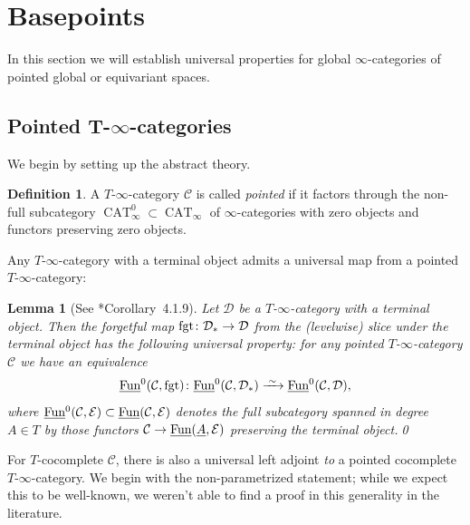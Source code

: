 \documentclass[reqno]{memo-l}
\theoremstyle{mythm}
\newtheorem{lemma}[thm]{Lemma}
\theoremstyle{definition}
\newtheorem{definition}[thm]{Definition}
\numberwithin{equation}{section}
\newcommand{\Cc}{{\mathcal{C}}}
\newcommand{\Dd}{{\mathcal{D}}}
\newcommand{\Ee}{{\mathcal{E}}}
\DeclareMathOperator{\CAT}{CAT}
\newcommand{\Fun}{{\textup{Fun}}}
\newcommand{\fgt}{\textup{fgt}}
\newcommand{\ulhelper}[2]{\underline{\setbox0=\hbox{$#1#2$}\dp0=0.4pt \box0\relax}}
\newcommand{\ul}[1]{{\mathpalette\ulhelper{#1}}\hbox{\rule[-2pt]{0pt}{0pt}}}
\newcommand{\iso}{\xrightarrow{\;\smash{\raisebox{-0.25ex}{\ensuremath{\scriptstyle\sim}}}\;}}
\begin{document}
\section{Basepoints}\label{sec:basepoints}
In this section we will establish universal properties for global $\infty$-categories of pointed global or equivariant spaces.

\subsection{Pointed \texorpdfstring{$\bm{T}$-$\bm{\infty}$}{T-∞}-categories} We begin by setting up the abstract theory.

\begin{definition}
    A $T$-$\infty$-category $\Cc$ is called \emph{pointed} if it factors through the non-full subcategory $\CAT_\infty^0\subset\CAT_\infty$ of $\infty$-categories with zero objects and functors preserving zero objects.
\end{definition}

Any $T$-$\infty$-category with a terminal object admits a universal map from a pointed $T$-$\infty$-category:

\begin{lemma}[See \cite{CLL_Global}*{Corollary~4.1.9}]
    Let $\Dd$ be a $T$-$\infty$-category with a terminal object. Then the forgetful map $\fgt\colon\Dd_*\to\Dd$ from the (levelwise) slice under the terminal object has the following universal property: for any pointed $T$-$\infty$-category $\Cc$ we have an equivalence
    \[
        \ul\Fun^0(\Cc,\fgt)\colon\ul\Fun^0(\Cc,\Dd_*)\iso\ul\Fun^0(\Cc,\Dd),
    \]
    where $\ul\Fun^0(\Cc,\Ee)\subset\ul\Fun(\Cc,\Ee)$ denotes the full subcategory spanned in degree $A\in T$ by those functors $\Cc\to\ul\Fun(\ul A,\Ee)$ preserving the terminal object.\qed
\end{lemma}

For $T$-cocomplete $\Cc$, there is also a universal left adjoint \emph{to} a pointed cocomplete $T$-$\infty$-category. We begin with the non-parametrized statement; while we expect this to be well-known, we weren't able to find a proof in this generality in the literature.
\end{document}
